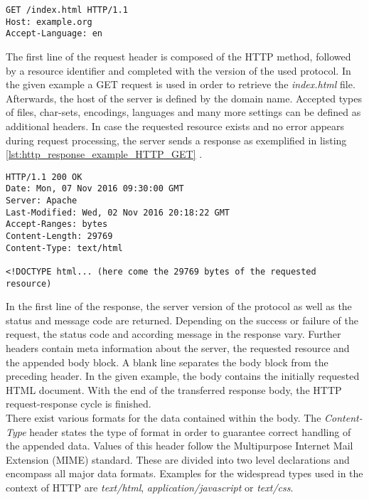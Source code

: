 \begin{lstlisting}[caption={Example for HTTP GET request}, label={lst:http_request_example_HTTP_GET}]
GET /index.html HTTP/1.1
Host: example.org
Accept-Language: en
\end{lstlisting}

The first line of the request header is composed of the HTTP method, followed by a resource identifier and completed with the version of the used protocol. In the given example a GET request is used in order to retrieve the \emph{index.html} file. Afterwards, the host of the server is defined by the domain name. Accepted types of files, char-sets, encodings, languages and many more settings can be defined as additional headers. In case the requested resource exists and no error appears during request processing, the server sends a response as exemplified in listing \ref{lst:http_response_example_HTTP_GET} \cite{MDN:2016}. \\

\begin{lstlisting}[caption={Example for HTTP GET response}, label={lst:http_response_example_HTTP_GET}]
HTTP/1.1 200 OK
Date: Mon, 07 Nov 2016 09:30:00 GMT
Server: Apache
Last-Modified: Wed, 02 Nov 2016 20:18:22 GMT
Accept-Ranges: bytes
Content-Length: 29769
Content-Type: text/html

<!DOCTYPE html... (here come the 29769 bytes of the requested resource)
\end{lstlisting}

In the first line of the response, the server version of the protocol as well as the status and message code are returned. Depending on the success or failure of the request, the status code and according message in the response vary. Further headers contain meta information about the server, the requested resource and the appended body block. A blank line separates the body block from the preceding header. In the given example, the body contains the initially requested HTML document. With the end of the transferred response body, the HTTP request-response cycle is finished. \\

There exist various formats for the data contained within the body. The \emph{Content-Type} header states the type of format in order to guarantee correct handling of the appended data. Values of this header follow the Multipurpose Internet Mail Extension (MIME) standard. These are divided into two level declarations and encompass all major data formats. Examples for the widespread types used in the context of HTTP are \emph{text/html}, \emph{application/javascript} or \emph{text/css}.

